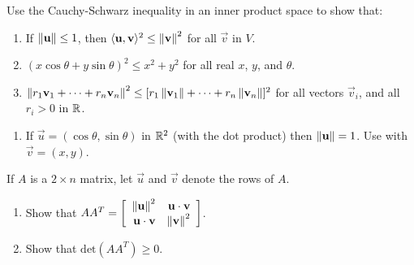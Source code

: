 \documentclass{ximera}
\begin{document}
\begin{problem}\label{prob:inner_prod_29}
Use the Cauchy-Schwarz inequality in an inner product space to show that:

\begin{enumerate} 
\item If $\left\lVert\mathbf{u}\right\rVert \leq 1$, then $\langle\mathbf{u}, \mathbf{v}\rangle^{2} \leq \left\lVert\mathbf{v}\right\rVert^{2}$ for all $\vec{v}$ in $V$.

\item $(x \cos \theta + y \sin \theta)^{2} \leq x^{2} + y^{2}$ for all real $x$, $y$, and $\theta$.

\item $\left\lVert r_1\mathbf{v}_1 + \dots + r_n\mathbf{v}_n \right\rVert ^2 \leq [r_1 \left\lVert \mathbf{v}_1 \right\rVert + \dots + r_n \left\lVert \mathbf{v}_n \right\rVert ]^2$
for all vectors $\vec{v}_{i}$, and all $r_{i} > 0$ in $\mathbb{R}$.

\end{enumerate}
\begin{hint}
\begin{enumerate} 
 
\item  If $\vec{u} = (\cos \theta, \sin \theta)$ in $\mathbb{R}^2$ (with the dot product) then $\left\lVert\mathbf{u}\right\rVert = 1$. Use  with $\vec{v} = (x, y)$.

\end{enumerate}
\end{hint}
\end{problem}

\begin{problem}\label{prob:inner_prod_30}
If $A$ is a $2 \times n$ matrix, let $\vec{u}$ and $\vec{v}$ denote the rows of $A$.

\begin{enumerate} 
\item Show that
$AA^T = \left[ \begin{array}{rr}
\left\lVert \mathbf{u} \right\rVert ^2 & \mathbf{u} \cdot \mathbf{v} \\
\mathbf{u} \cdot \mathbf{v} & \left\lVert \mathbf{v} \right\rVert ^2
\end{array} \right]$.

\item Show that $\mbox{det}(AA^{T}) \geq 0$.

\end{enumerate}
\end{problem}
\end{document}
